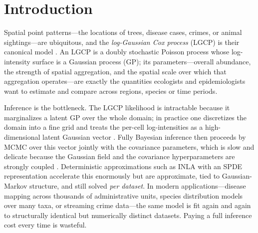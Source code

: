 \documentclass[11pt]{article}
\begin{document}
\begin{abstract}
(informative locations, where the usual analysis is biased) and \emph{spatial
aggregation} (only coarse regional totals observed, the change-of-support
problem)---adding the process to the simulator yields calibrated, bias-corrected
inference that a design-aware estimator delivers at no extra methodological cost,
and that correctly widens its uncertainty as aggregation destroys information.
On real data---a crime point pattern and a Burkina Faso malaria
prevalence survey (disease mapping)---the amortized estimators recover the
NUTS risk map and parameters in milliseconds rather than minutes. Amortized SBI thus makes calibrated LGCP inference
not only fast but extensible to observation processes that defeat likelihood-based
tools.
\end{abstract}

\section{Introduction}

Spatial point patterns---the locations of trees, disease cases, crimes, or animal
sightings---are ubiquitous, and the \emph{log-Gaussian Cox process} (LGCP) is
their canonical model \citep{moller1998log,diggle2013spatial}. An LGCP is a doubly
stochastic Poisson process whose log-intensity surface is a Gaussian process (GP);
its parameters---overall abundance, the strength of spatial aggregation, and the
spatial scale over which that aggregation operates---are exactly the quantities
ecologists and epidemiologists want to estimate and compare across regions,
species or time periods.

Inference is the bottleneck. The LGCP likelihood is intractable because it
marginalizes a latent GP over the whole domain; in practice one discretizes the
domain into a fine grid and treats the per-cell log-intensities as a
high-dimensional latent Gaussian vector \citep{moller1998log}. Fully Bayesian
inference then proceeds by MCMC over this vector jointly with the covariance
parameters, which is slow and delicate because the Gaussian field and the
covariance hyperparameters are strongly coupled \citep{christensen2005robust,
murray2010elliptical}. Deterministic approximations such as INLA with an SPDE
representation \citep{rue2009approximate,lindgren2011explicit} accelerate this
enormously but are approximate, tied to Gaussian-Markov structure, and still
solved \emph{per dataset}. In modern applications---disease mapping across
thousands of administrative units, species distribution models over many taxa,
or streaming crime data---the same model is fit again and again to structurally
identical but numerically distinct datasets. Paying a full inference cost every
time is wasteful.
\end{document}
